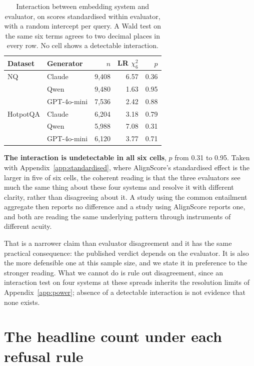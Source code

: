 \documentclass[11pt]{article}
\begin{document}
\begin{table}[t]
\centering\small
\begin{tabular}{llrrr}
\toprule
\textbf{Dataset} & \textbf{Generator} & $n$ & LR $\chi^2_6$ & $p$ \\
\midrule
NQ & Claude & 9,408 & 6.57 & 0.36 \\
 & Qwen & 9,480 & 1.63 & 0.95 \\
 & GPT-4o-mini & 7,536 & 2.42 & 0.88 \\
\midrule
HotpotQA & Claude & 6,204 & 3.18 & 0.79 \\
 & Qwen & 5,988 & 7.08 & 0.31 \\
 & GPT-4o-mini & 6,120 & 3.77 & 0.71 \\
\bottomrule
\end{tabular}
\caption{Interaction between embedding system and evaluator, on scores standardised within evaluator, with a random intercept per query. A Wald test on the same six terms agrees to two decimal places in every row. No cell shows a detectable interaction.}
\label{tab:interaction}
\end{table}

\textbf{The interaction is undetectable in all six cells}, $p$ from 0.31 to 0.95. Taken with Appendix~\ref{app:standardised}, where AlignScore's standardised effect is the larger in five of six cells, the coherent reading is that the three evaluators see much the same thing about these four systems and resolve it with different clarity, rather than disagreeing about it. A study using the common entailment aggregate then reports no difference and a study using AlignScore reports one, and both are reading the same underlying pattern through instruments of different acuity.

That is a narrower claim than evaluator disagreement and it has the same practical consequence: the published verdict depends on the evaluator. It is also the more defensible one at this sample size, and we state it in preference to the stronger reading. What we cannot do is rule out disagreement, since an interaction test on four systems at these spreads inherits the resolution limits of Appendix~\ref{app:power}; absence of a detectable interaction is not evidence that none exists.


\section{The headline count under each refusal rule}
\label{app:refusalrule}
\end{document}
